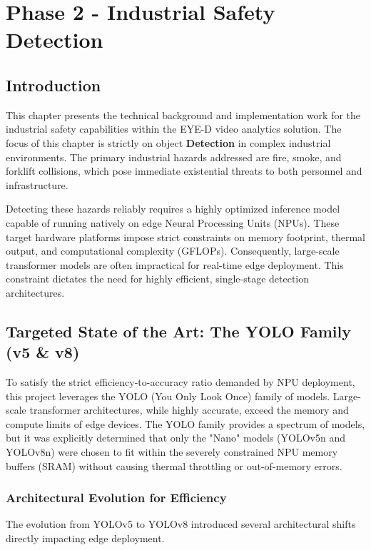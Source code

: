 ﻿\chapter{Phase 2 - Industrial Safety Detection}
\setcounter{section}{0}
\renewcommand{\thesection}{\arabic{section}}
\label{chap:industrial-safety}

\section*{Introduction}
This chapter presents the technical background and implementation work for the industrial safety capabilities within the EYE-D video analytics solution. The focus of this chapter is strictly on object \textbf{Detection} in complex industrial environments. The primary industrial hazards addressed are fire, smoke, and forklift collisions, which pose immediate existential threats to both personnel and infrastructure.

Detecting these hazards reliably requires a highly optimized inference model capable of running natively on edge Neural Processing Units (NPUs). These target hardware platforms impose strict constraints on memory footprint, thermal output, and computational complexity (GFLOPs). Consequently, large-scale transformer models are often impractical for real-time edge deployment. This constraint dictates the need for highly efficient, single-stage detection architectures.

\section{Targeted State of the Art: The YOLO Family (v5 \& v8)}
To satisfy the strict efficiency-to-accuracy ratio demanded by NPU deployment, this project leverages the YOLO (You Only Look Once) family of models. Large-scale transformer architectures, while highly accurate, exceed the memory and compute limits of edge devices. The YOLO family provides a spectrum of models, but it was explicitly determined that only the "Nano" models (YOLOv5n and YOLOv8n) were chosen to fit within the severely constrained NPU memory buffers (SRAM) without causing thermal throttling or out-of-memory errors.

\subsection{Architectural Evolution for Efficiency}
The evolution from YOLOv5 to YOLOv8 introduced several architectural shifts directly impacting edge deployment.

